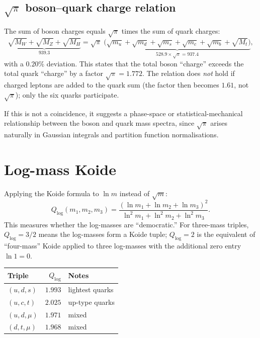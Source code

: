 \documentclass[11pt]{article}
\begin{document}
\subsection{$\sqrt{\pi}$ boson--quark charge relation}

The sum of boson charges equals $\sqrt{\pi}$ times the
sum of quark charges:
\begin{equation}
  \underbrace{\sqrt{M_W}+\sqrt{M_Z}+\sqrt{M_H}}_{939.3}
  = \sqrt{\pi}\;\underbrace{
  \bigl(\sqrt{m_u}+\sqrt{m_d}+\sqrt{m_s}
  +\sqrt{m_c}+\sqrt{m_b}+\sqrt{M_t}\bigr)}_{528.9\times\sqrt{\pi}
  = 937.4},
\end{equation}
with a $0.20\%$ deviation.  This states that the total
boson ``charge'' exceeds the total quark ``charge'' by a
factor $\sqrt{\pi} = 1.772$.  The relation does \emph{not}
hold if charged leptons are added to the quark sum
(the factor then becomes $1.61$, not $\sqrt{\pi}$);
only the six quarks participate.

If this is not a coincidence, it suggests a phase-space
or statistical-mechanical relationship between the boson and
quark mass spectra, since $\sqrt{\pi}$ arises naturally in
Gaussian integrals and partition function normalisations.

\section{Log-mass Koide}

Applying the Koide formula to $\ln m$ instead of
$\sqrt{m}$:
\begin{equation}
  Q_{\log}(m_1,m_2,m_3)
  = \frac{(\ln m_1 + \ln m_2 + \ln m_3)^2}
  {\ln^2 m_1 + \ln^2 m_2 + \ln^2 m_3}.
\end{equation}
This measures whether the log-masses are ``democratic.''
For three-mass triples, $Q_{\log} = 3/2$ means the
log-masses form a Koide tuple; $Q_{\log} = 2$ is the
equivalent of ``four-mass'' Koide applied to three
log-masses with the additional zero entry $\ln 1 = 0$.

\begin{center}\small
\begin{tabular}{@{}l r l@{}}
\toprule
Triple & $Q_{\log}$ & Notes \\
\midrule
$(u,d,s)$ & $1.993$ & lightest quarks \\
$(u,c,t)$ & $2.025$ & up-type quarks \\
$(u,d,\mu)$ & $1.971$ & mixed \\
$(d,t,\mu)$ & $1.968$ & mixed \\
\bottomrule
\end{tabular}
\end{center}
\end{document}
